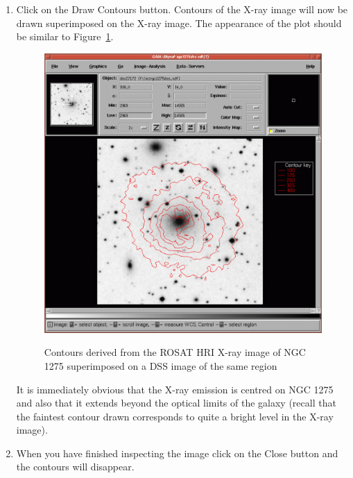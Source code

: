 \documentclass[twoside,11pt]{starlink}
\begin{document}
\begin{enumerate}
  \item Click on the \textsf{Draw Contours} button.  Contours of the X-ray
   image will now be drawn superimposed on the X-ray image.  The
   appearance of the plot should be similar to Figure~\ref{SUPER_R_SUPER}.

  \begin{figure}[htbp]
     \centering
     \includegraphics[totalheight=6in]{sc17_super_r_super}
     \begin{quote}
     \caption[X-ray contours superimposed a DSS image of NGC 1275]
      {Contours derived from the ROSAT HRI X-ray image of NGC 1275
      superimposed on a DSS image of the same region
     \label{SUPER_R_SUPER} }
     \end{quote}
  \end{figure}

   It is immediately obvious that the X-ray emission is centred on NGC
   1275 and also that it extends beyond the optical limits of the
   galaxy (recall that the faintest contour drawn corresponds to quite
   a bright level in the X-ray image).

  \item When you have finished inspecting the image click on the \textsf{Close} button and the contours will disappear.

\end{enumerate}
\end{document}
